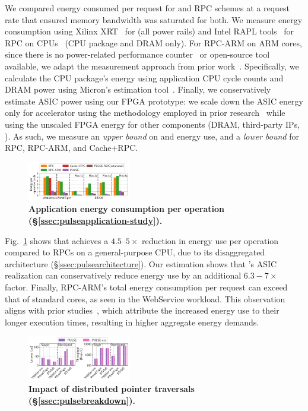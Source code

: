  We compared energy consumed per request for \pulse and RPC schemes at a request rate that ensured memory bandwidth was saturated for both. We measure energy consumption using Xilinx XRT~\cite{xilinx_xrt} for \pulse (all power rails) and Intel RAPL tools~\cite{intel_rapl} for RPC on CPUs~\cite{intelprocessor} (CPU package and DRAM only). For RPC-ARM on ARM cores, since there is no power-related performance counter~\cite{armv8registers} or open-source tool available, we adapt the measurement approach from prior work~\cite{clio}. Specifically, we calculate the CPU package's energy using application CPU cycle counts and DRAM power using Micron's estimation tool~\cite{micron}. Finally, we conservatively estimate ASIC power using our FPGA prototype: we scale down the ASIC energy only for \pulse accelerator using the methodology employed in prior research~\cite{asicpower} while using the unscaled FPGA energy for other components (DRAM, third-party IPs, \etc). As such, we measure an \emph{upper bound} on \pulse and \pulseasic energy use, and a \emph{lower bound} for RPC, RPC-ARM, and Cache+RPC.

\begin{figure}[t]
\centering
\includegraphics[width=0.4\textwidth]{fig/pulse/power.pdf}
\caption[Application energy consumption per operation]{\textbf{Application energy consumption per operation (\S\ref{ssec:pulseapplication-study}).}}
\label{fig:eval_energy}
\end{figure}

Fig.~\ref{fig:eval_energy} shows that \pulse achieves a $4.5$--$5\times$ reduction in energy use per operation compared to RPCs on a general-purpose CPU, due to its disaggregated architecture (\S\ref{ssec:pulsearchitecture}). Our estimation shows that \pulse's ASIC realization can conservatively reduce energy use by an additional $6.3-7\times$ factor. 
Finally, RPC-ARM's total energy consumption per request can exceed that of standard cores, as seen in the WebService workload. This observation aligns with prior studies~\cite{clio}, which attribute the increased energy use to their longer execution times, resulting in higher aggregate energy demands.

\begin{figure}[t]
\centering
\includegraphics[width=0.4\textwidth]{fig/pulse/breakdown.pdf}%
\caption[Impact of distributed pointer traversals]{\textbf{Impact of distributed pointer traversals (\S\ref{ssec:pulsebreakdown}).}}
\label{fig:eval_breakdown}
\end{figure}

